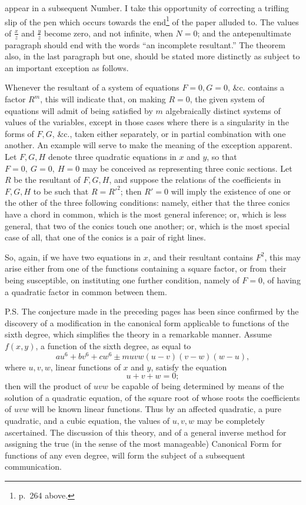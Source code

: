 \documentclass[11pt]{article}
\newcommand{\sourcepage}[1]{\marginpar{\scriptsize p.~#1}}
\begin{document}
{{\sourcepage{283}
appear in a subsequent Number. I take this opportunity of correcting a trifling slip of the pen which occurs towards the end\footnote{p.~264 above.} of the paper alluded to. The values of $\frac{x}{z}$ and $\frac{y}{z}$ become zero, and not infinite, when $N=0$; and the antepenultimate paragraph should end with the words ``an incomplete resultant.'' The theorem also, in the last paragraph but one, should be stated more distinctly as subject to an important exception as follows.

Whenever the resultant of a system of equations $F=0,G=0$, \&c. contains a factor $R^m$, this will indicate that, on making $R=0$, the given system of equations will admit of being satisfied by $m$ algebraically distinct systems of values of the variables, except in those cases where there is a singularity in the forms of $F,G$, \&c., taken either separately, or in partial combination with one another. An example will serve to make the meaning of the exception apparent. Let $F,G,H$ denote three quadratic equations in $x$ and $y$, so that $F=0,\ G=0,\ H=0$ may be conceived as representing three conic sections. Let $R$ be the resultant of $F,G,H$, and suppose the relations of the coefficients in $F,G,H$ to be such that $R=R'^2$; then $R'=0$ will imply the existence of one or the other of the three following conditions: namely, either that the three conics have a chord in common, which is the most general inference; or, which is less general, that two of the conics touch one another; or, which is the most special case of all, that one of the conics is a pair of right lines.

So, again, if we have two equations in $x$, and their resultant contains $F^2$, this may arise either from one of the functions containing a square factor, or from their being susceptible, on instituting one further condition, namely of $F=0$, of having a quadratic factor in common between them.

P.S. The conjecture made in the preceding pages has been since confirmed by the discovery of a modification in the canonical form applicable to functions of the sixth degree, which simplifies the theory in a remarkable manner. Assume $f(x,y)$, a function of the sixth degree, as equal to
\[
au^6+bv^6+cw^6\pm muvw(u-v)(v-w)(w-u),
\]
where $u,v,w$, linear functions of $x$ and $y$, satisfy the equation
\[
u+v+w=0;
\]
then will the product of $uvw$ be capable of being determined by means of the solution of a quadratic equation, of the square root of whose roots the coefficients of $uvw$ will be known linear functions. Thus by an affected quadratic, a pure quadratic, and a cubic equation, the values of $u,v,w$ may be completely ascertained. The discussion of this theory, and of a general inverse method for assigning the true (in the sense of the most manageable) Canonical Form for functions of any even degree, will form the subject of a subsequent communication.


}}
\end{document}
